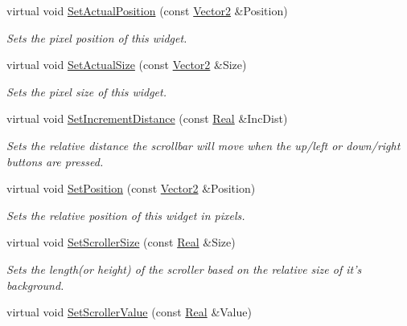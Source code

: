 \begin{DoxyCompactItemize}
virtual void \hyperlink{classMezzanine_1_1UI_1_1Scrollbar_a24034754316c9bc241e07fe4acbf6a62}{SetActualPosition} (const \hyperlink{classMezzanine_1_1Vector2}{Vector2} \&Position)
\begin{DoxyCompactList}\small\item\em Sets the pixel position of this widget. \item\end{DoxyCompactList}\item 
virtual void \hyperlink{classMezzanine_1_1UI_1_1Scrollbar_ac026591a6a40d0d6e0bf4c321dc57628}{SetActualSize} (const \hyperlink{classMezzanine_1_1Vector2}{Vector2} \&Size)
\begin{DoxyCompactList}\small\item\em Sets the pixel size of this widget. \item\end{DoxyCompactList}\item 
virtual void \hyperlink{classMezzanine_1_1UI_1_1Scrollbar_a8e9d746ac93dc3e6e03e8853f362c2bb}{SetIncrementDistance} (const \hyperlink{namespaceMezzanine_a726731b1a7df72bf3583e4a97282c6f6}{Real} \&IncDist)
\begin{DoxyCompactList}\small\item\em Sets the relative distance the scrollbar will move when the up/left or down/right buttons are pressed. \item\end{DoxyCompactList}\item 
virtual void \hyperlink{classMezzanine_1_1UI_1_1Scrollbar_a7c0f281e287500a52a735ded33d71fa6}{SetPosition} (const \hyperlink{classMezzanine_1_1Vector2}{Vector2} \&Position)
\begin{DoxyCompactList}\small\item\em Sets the relative position of this widget in pixels. \item\end{DoxyCompactList}\item 
virtual void \hyperlink{classMezzanine_1_1UI_1_1Scrollbar_ab0eb07194c16e262a5a842077eb27e3b}{SetScrollerSize} (const \hyperlink{namespaceMezzanine_a726731b1a7df72bf3583e4a97282c6f6}{Real} \&Size)
\begin{DoxyCompactList}\small\item\em Sets the length(or height) of the scroller based on the relative size of it's background. \item\end{DoxyCompactList}\item 
virtual void \hyperlink{classMezzanine_1_1UI_1_1Scrollbar_a08cd47814e026b1eb20d25c1a3ec5e54}{SetScrollerValue} (const \hyperlink{namespaceMezzanine_a726731b1a7df72bf3583e4a97282c6f6}{Real} \&Value)

\end{DoxyCompactItemize}
